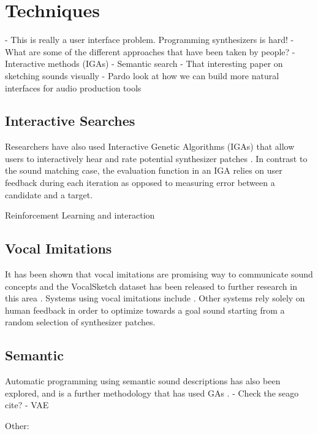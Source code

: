 
\section{Techniques}
- This is really a user interface problem. Programming synthesizers is hard!
- What are some of the different approaches that have been taken by people?
- Interactive methods (IGAs)
- Semantic search
- That interesting paper on sketching sounds visually
- Pardo look at how we can build more natural interfaces for audio production tools \cite{pardo2019learning}

\subsection{Interactive Searches}
Researchers have also used Interactive Genetic Algorithms (IGAs) that allow users to interactively hear and rate potential synthesizer patches \cite{johnson1999exploring, dahlstedt2001creating, yee2016use}. In contrast to the sound matching case, the evaluation function in an IGA relies on user feedback during each iteration as opposed to measuring error between a candidate and a target. 

Reinforcement Learning and interaction \cite{scurto2021designing}

 \subsection{Vocal Imitations}
 It has been shown that vocal imitations are promising way to communicate sound concepts \cite{lemaitre2014effectiveness} and the VocalSketch dataset has been released to further research in this area \cite{cartwright2015vocalsketch}. Systems using vocal imitations include \cite{mcartwright2014}\cite{zhang2018visualization}. Other systems rely solely on human feedback in order to optimize towards a goal sound starting from a random selection of synthesizer patches. 
 
 \subsection{Semantic}
 Automatic programming using semantic sound descriptions has also been explored, and is a further methodology that has used GAs \cite{krekovic2016algorithm}.
 - Check the seago cite?
 \cite{roche2021make} - VAE
 
 Other:
 
